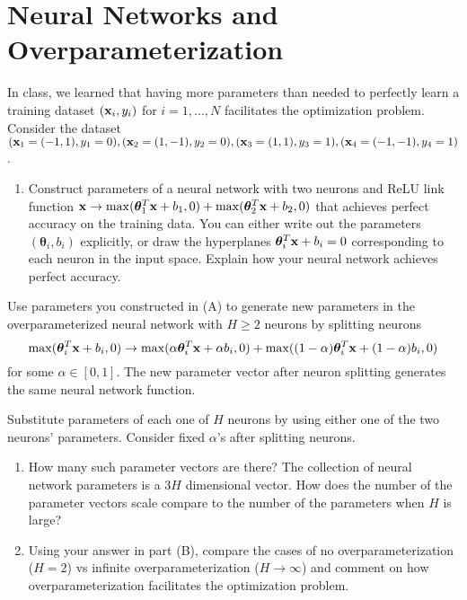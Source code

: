 \documentclass[11pt]{article}
\begin{document}
\newpage

\section{Neural Networks and Overparameterization}

In class, we learned that having more parameters than needed to perfectly learn a training dataset $({\mathbf x}_i, y_i)$ for $i=1,...,N$ 
facilitates the optimization problem. 
Consider the dataset $({\mathbf x}_1=(-1,1), y_1=0), ({\mathbf x}_2=(1,-1), y_2=0), ({\mathbf x}_3=(1,1), y_3=1), ({\mathbf x}_4=(-1,-1), y_4=1)$.

\begin{enumerate}[label=(\Alph*)]

\item Construct parameters of a neural network with two neurons and ReLU link function 
${\mathbf x} \to \max(\boldsymbol{\theta}_1^T {\mathbf x} + b_1, 0) + \max(\boldsymbol{\theta}_2^T {\mathbf x} + b_2, 0)$ 
that achieves perfect accuracy on the training data. 
You can either write out the parameters $ (\boldsymbol{\theta}_i, b_i)$ explicitly, or draw the hyperplanes $ \boldsymbol{\theta}_i^T {\mathbf x} + b_i = 0$ corresponding to each neuron in the input space. 
Explain how your neural network achieves perfect accuracy. 

\end{enumerate}

\noindent 
Use parameters you constructed in (A) to generate new parameters in the overparameterized neural network with $ H \geq 2 $ neurons
by splitting neurons 
\[
    \max(\boldsymbol{\theta}_i^T {\mathbf x} + b_i, 0) \to  \max(\alpha \boldsymbol{\theta}_i^T {\mathbf x} + \alpha b_i, 0)  + \max((1-\alpha) \boldsymbol{\theta}_i^T {\mathbf x} + (1-\alpha) b_i, 0)
\]
for some $\alpha \in [0, 1]$. The new parameter vector after neuron splitting generates the same neural network function. 

\noindent 
Substitute parameters of each one of $H$ neurons by using either one of the two neurons' parameters. 
Consider fixed $\alpha$'s after splitting neurons.

\begin{enumerate}[label=(\Alph*), start=2] 

\item How many such parameter vectors are there? The collection of neural network parameters is a $3 H$ dimensional vector. 
How does the number of the parameter vectors scale compare to the number of the parameters when $H$ is large? 

\item Using your answer in part (B), compare the cases of no overparameterization ($H=2$) vs infinite overparameterization ($H \to \infty$) and  
comment on how overparameterization facilitates the optimization problem. 

\end{enumerate}
\end{document}
